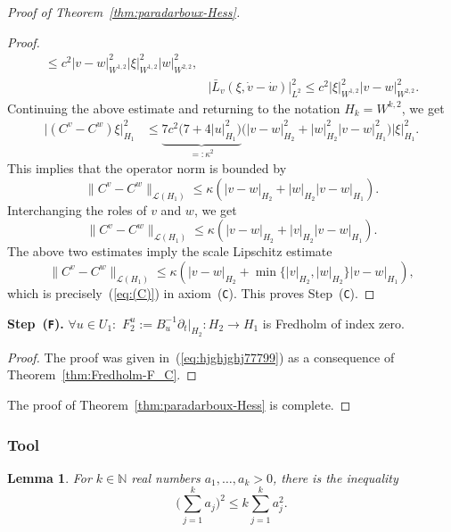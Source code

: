 \documentclass[pdftex]{sigma}
\numberwithin{equation}{section}
\newtheorem{Lemma}[Theorem]{Lemma}
\newcommand{\N}{{\mathbb{N}}}
\newcommand{\Ll}{{\mathcal{L}}} %
\newcommand{\norm}{{\rm norm}}
\def\abs#1{\mathopen|#1\mathclose|}
\def\norm#1{\mathopen\|#1\mathclose\|}
\newcommand{\p}{{\partial}}
\newcommand{\1}{{{\mathchoice {\rm 1\mskip-4mu l} {\rm 1\mskip-4mu l}
{\rm 1\mskip-4.5mu l} {\rm 1\mskip-5mu l}}}}
\begin{document}
\begin{proof}[Proof of Theorem~\ref{thm:paradarboux-Hess}]
\begin{proof}
\begin{equation*}
\begin{split}
\le c^2 \abs{v-w}_{W^{1,2}}^2 \abs{\xi}_{W^{1,2}}^2 \abs{w}_{W^{2,2}}^2,
\\
& \bigl|\bar L_v(\xi,\dot v-\dot w)\bigr|_{L^2}^2
\le c^2 \abs{\xi}_{W^{1,2}}^2\abs{v-w}_{W^{2,2}}^2.
\end{split}
\end{equation*}
Continuing the above estimate
and returning to the notation $H_k=W^{k,2}$, we get
\begin{equation*}
\begin{split}
 \abs{(C^v-C^w)\xi}_{H_1}^2
 &\le \underbrace{7 c^2 \bigl(7+4\abs{u}_{H_1}^2\bigr)}_{=:\kappa^2}
 \bigl(\abs{v-w}_{H_2}^2+\abs{w}_{H_2}^2\abs{v-w}_{H_1}^2\bigr)
 \abs{\xi}_{H_1}^2 .
\end{split}
\end{equation*}
This implies that the operator norm is bounded by
\[
 \norm{C^v-C^w}_{\Ll(H_1)}
 \le\kappa (\abs{v-w}_{H_2}+\abs{w}_{H_2}\abs{v-w}_{H_1} ).
\]
Interchanging the roles of $v$ and $w$, we get
\[
 \norm{C^v-C^w}_{\Ll(H_1)}
 \le\kappa (\abs{v-w}_{H_2}+\abs{v}_{H_2}\abs{v-w}_{H_1} ).
\]
The above two estimates imply the scale Lipschitz estimate
\begin{equation}\label{eq:C-paraDarboux}
 \norm{C^v-C^w}_{\Ll(H_1)}
 \le\kappa (\abs{v-w}_{H_2}
 +\min\{\abs{v}_{H_2},\abs{w}_{H_2}\}\abs{v-w}_{H_1}
 ),
\end{equation}
which is precisely~(\ref{eq:(C)}) in axiom~(\texttt{C}).
This proves Step~(\texttt{C}).
\end{proof}

\noindent
\textbf{Step~(\texttt{F}).} $\forall u\in U_1\colon$
$F^u_2:=B_u^{-1}\p_t |_{H_2}\colon H_2\to H_1$ is Fredholm of index zero.

\begin{proof}
The proof was given in~(\ref{eq:hjghjghj77799})
as a consequence of Theorem~\ref{thm:Fredholm-F_C}.
\end{proof}

The proof of Theorem~\ref{thm:paradarboux-Hess} is complete.
\end{proof}

\subsubsection*{Tool}

\begin{Lemma}\label{le:sum-quad}
For $k\in\N$ real numbers $a_1,\dots,a_k>0$, there is the inequality
\[
 \Biggl(\sum_{j=1}^k a_j\Biggr)^2
 \le k\sum_{j=1}^k a_j^2 .
\]
\end{Lemma}
\end{document}
